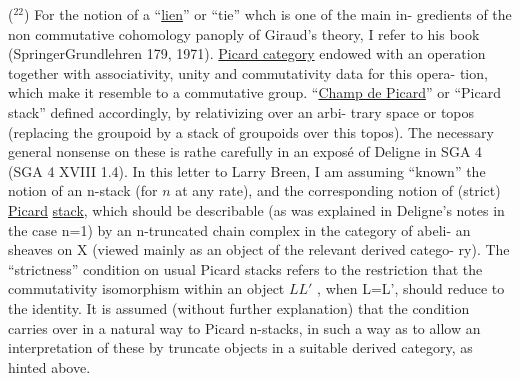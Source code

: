 
(${}^{22}$) For the notion of a ``\uline{lien}'' \hand{(}or ``tie''\hand{)}\hand{,} whch is one of the main in-%
gredients of the non commutative cohomology panoply of Giraud's theory, I
refer to his book (Springer\hand{,}Grundlehren 179, 1971).\hand{/} \uline{Picard category}
\margin{$\otimes$,}  endowed with an operation \inserted{$\otimes$}  
together with associativity, unity and commutativity data for this opera-%
tion, which make it resemble to a commutative group.  ``\uline{Champ de Picard}''
\hand{(}or ``Picard stack''\hand{)}   defined accordingly, by relativizing over an arbi-%
trary space or topos (replacing the groupoid by a stack of groupoids over
this topos). The necessary general nonsense on these  is  rathe
carefully in an exposé of Deligne in SGA 4 (SGA 4 XVIII 1.4). In this
letter to Larry Breen, I am assuming ``known'' the notion of an n-stack
(for $n$ at any rate), and the corresponding notion of (strict) \uline{Picard}
\uline{stack}, which should be describable (as was explained in Deligne's notes
in the case n=1) by an n-truncated chain complex in the category of abeli-%
an sheaves on X (viewed mainly as an object of the relevant derived catego-%
ry). The ``strictness'' condition on usual Picard stacks refers to the
restriction that the commutativity isomorphism within an object $L$\hand{$\otimes$}$L'$ , 
when L=L', should reduce to the identity. It is assumed (without further
explanation) that the condition carries over in a natural way to Picard
n-stacks, in such a way as to allow an interpretation of these by truncate
objects in a suitable derived category, as hinted above.

